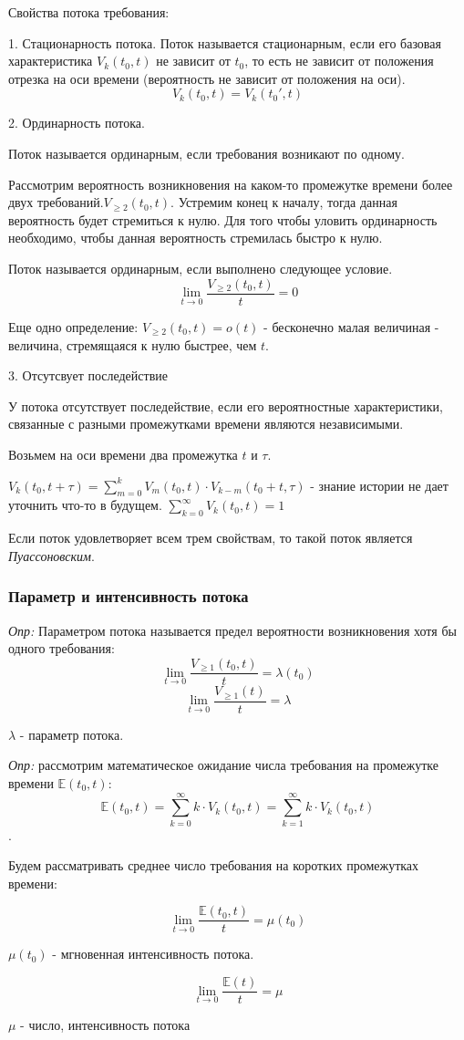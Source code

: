 \documentclass[aps,%
12pt,%
final,%
oneside,
onecolumn,%
musixtex, %
superscriptaddress,%
centertags]{article} %
\theoremstyle{plain}
\begin{document}
Свойства потока требования:

1. Стационарность потока. Поток называется стационарным, если его базовая характеристика $V_k(t_0,t) $ не зависит от $t_0$, то есть не зависит от положения отрезка на оси времени (вероятность не зависит от положения на оси).
$$ V_k(t_0,t) = V_k(t_0',t)$$

2. Ординарность потока. 

Поток называется ординарным, если требования возникают по одному.

Рассмотрим вероятность возникновения на каком-то промежутке времени более двух требований.$V_{\geq 2} (t_0,t)$. Устремим конец к началу, тогда данная вероятность будет стремиться к нулю. Для того чтобы уловить ординарность необходимо, чтобы данная вероятность стремилась быстро к нулю.

Поток называется ординарным, если выполнено следующее условие.
$$\lim_{t \to 0}  \frac{V_{\geq 2} (t_0,t)}{t} = 0$$

Еще одно определение: $ V_{\geq 2} (t_0,t) = o(t)$ - бесконечно малая величиная - величина, стремящаяся к нулю быстрее, чем $t$.

3. Отсутсвует последействие

У потока отсутствует последействие, если его вероятностные характеристики, связанные с разными промежутками времени являются независимыми.

Возьмем на оси времени два промежутка $t \text{ и } \tau$. 

$V_k(t_0,t+\tau) = \sum_{m=0}^{k} V_m(t_0,t) \cdot V_{k-m} (t_0+t,\tau)$ - знание истории не дает уточнить что-то в будущем.
$\sum_{k=0}^{\infty} V_k(t_0,t) = 1$

Если поток удовлетворяет всем трем свойствам, то такой поток является \textit{Пуассоновским}.

\subsubsection{Параметр и интенсивность потока}

\textit{Опр:} Параметром потока называется предел вероятности возникновения хотя бы одного требования:
$$\lim_{t \to 0}  \frac{V_{\geq 1} (t_0,t)}{t} = \lambda (t_0)$$
$$\lim_{t \to 0}  \frac{V_{\geq 1} (t)}{t} = \lambda$$

$\lambda$ - параметр потока.

\textit{Опр:} рассмотрим математическое ожидание числа требования на промежутке времени $\mathbb{E}(t_0,t)$:
$$\mathbb{E}(t_0,t) = \sum_{k=0}^{\infty} k \cdot V_k(t_0,t) =  \sum_{k=1}^{\infty} k \cdot V_k(t_0,t) $$.

Будем рассматривать среднее число требования на коротких промежутках времени:

$$ \lim_{t \to 0}  \frac{\mathbb{E}(t_0,t)}{t} = \mu (t_0)$$

$\mu(t_0)$ - мгновенная интенсивность потока.

$$ \lim_{t \to 0}  \frac{\mathbb{E}(t)}{t} = \mu$$

$\mu$ - число, интенсивность потока
\end{document}
